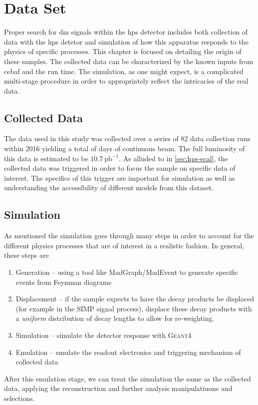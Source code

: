 \chapter{Data Set}
\label{chapter:hps:dataset}

Proper search for \ac{dm} signals within the \ac{hps} detector includes both collection of data
with the \ac{hps} detetor and simulation of how this apparatus responds to the physics of specific
processes. This chapter is focused on detailing the origin of these samples. The collected data can
be characterized by the known inputs from \ac{cebaf} and the run time. The simulation, as one might
expect, is a complicated multi-stage procedure in order to appropriately reflect the intricacies of
the real data.

\section{Collected Data} \label{sec:hps:data}
The data used in this study was collected over a series of 82 data collection runs within 2016
yielding a total of  days of
continuous beam. The full luminosity of this data is estimated to be $10.7~\text{pb}^{-1}$. As
alluded to in \cref{sec:hps-ecal}, the collected data was triggered in order to focus the sample on
specific data of interest. The specifics of this trigger are important for simulation as well as
understanding the accessibility of different models from this dataset. 

\section{Simulation} \label{sec:hps:sim}
As mentioned the simulation goes through many steps in order to account for the different physics
processes that are of interest in a realistic fashion. In general, these steps are
\begin{enumerate}
  \item Generation -- using a tool like {\sc MadGraph/MadEvent} to generate
        specific events from Feynman diagrams
  \item Displacement -- if the sample expects to have the decay products be displaced (for example in the
        SIMP signal process), displace these decay products with a \emph{uniform} distribution of decay
        lengths to allow for re-weighting.
  \item Simulation -- simulate the detector response with \textsc{Geant4}\cite{geant4}
  \item Emulation -- emulate the readout electronics and triggering mechanism of collected data
\end{enumerate}
After this emulation stage, we can treat the simulation the same as the collected data,
applying the reconstruction and further analysis manipulatiuons and selections.

